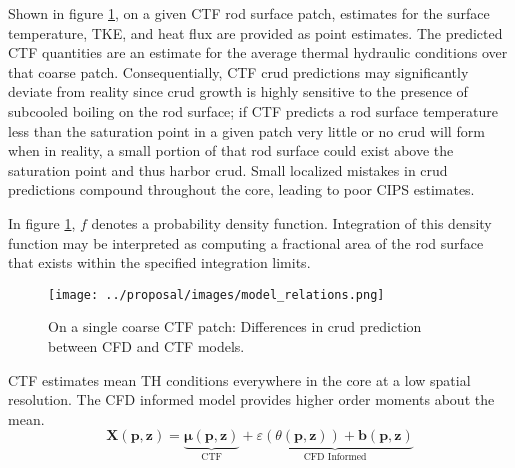 Shown in figure \ref{fig:model_overview}, on a given CTF rod surface patch, estimates for the surface temperature, TKE, and heat flux are provided as point estimates.  The predicted CTF quantities are an estimate for the average thermal hydraulic conditions over that coarse patch.   Consequentially, CTF crud predictions may significantly deviate from reality since crud growth is highly sensitive to the presence of subcooled boiling on the rod surface; if CTF predicts a rod surface temperature less than the saturation point in a given patch very little or no crud will form when in reality, a small portion of that rod surface could exist above the saturation point and thus harbor crud.  Small localized mistakes in crud predictions compound throughout the core, leading to poor CIPS estimates. 

In figure \ref{fig:model_overview}, $f$ denotes a probability density function.  Integration of this density function may be interpreted as computing a fractional area of the rod surface that exists within the specified integration limits.  
\begin{figure}[!htbp]
    \centering
    \texttt{[image: ../proposal/images/model\_relations.png]}
    \caption{On a single coarse CTF patch: Differences in crud prediction between CFD and CTF models.}
    \label{fig:model_overview}
\end{figure}

CTF estimates mean TH conditions everywhere in the core at a low spatial resolution.  The CFD informed model provides higher order moments about the mean.
\begin{equation}
   \mathbf X(\mathbf p, \mathbf z) = \underbrace{ \bm \mu(\mathbf p, \mathbf{z})}_\text{CTF} +
   \underbrace{\varepsilon({\theta (\bm p, \mathbf z)}) + \bm b(\mathbf p, \mathbf{z})}_\text{CFD Informed}
   \label{eq:hi2lo_overview}
\end{equation}

